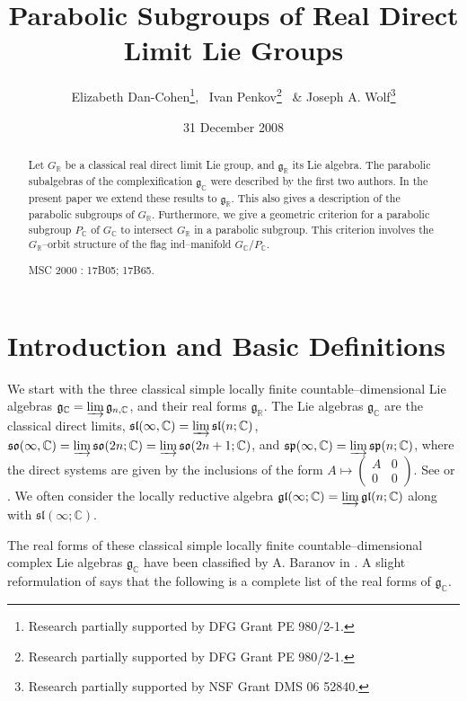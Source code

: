 \documentclass[oneside,leqno,11pt]{article}
\title{Parabolic Subgroups of Real Direct Limit Lie Groups}
\def\gg{\mathfrak{g}}
\def\ggl{\mathfrak{gl}}
\def\gsl{\mathfrak{sl}}
\def\gso{\mathfrak{so}}
\def\gsp{\mathfrak{sp}}
\def\C{\mathbb{C}}
\def\R{\mathbb{R}}
\begin{document}
\author{Elizabeth Dan-Cohen\thanks{Research partially supported by DFG Grant PE 980/2-1.},
\, Ivan Penkov\thanks{Research partially supported by  DFG Grant  PE 980/2-1.}
\, \& Joseph A. Wolf\thanks{Research partially supported by NSF Grant
DMS 06 52840.
}}
\date{31 December 2008}

\maketitle

\begin{abstract}
Let $G_\R$ be a classical real direct limit Lie group, and $\gg_\R$ its 
Lie algebra.  The parabolic subalgebras of the complexification 
$\gg_\C$ were described by the first two authors.  In the present paper 
we extend these results to $\gg_\R$.  This also gives a description of 
the parabolic subgroups of $G_\R$.  Furthermore, we give 
a geometric criterion for a parabolic subgroup $P_\C$ of $G_\C$ to 
intersect $G_\R$ in a parabolic subgroup.  This criterion involves the
$G_\R$--orbit structure of the flag ind--manifold $G_\C/P_\C$.

\vspace{10pt}
\noindent MSC 2000 : 17B05; 17B65.
\end{abstract}

\section{Introduction and Basic Definitions} \label{sec1}
\setcounter{equation}{0}

We start with the three classical simple locally finite countable--dimensional Lie 
algebras $\gg_\C = \varinjlim \gg_{n,\C}$, and their real forms
$\gg_\R$.  The Lie algebras $\gg_\C$ are the classical direct limits,
$\gsl(\infty,\C) = \varinjlim \gsl(n;\C)$,
$\gso(\infty,\C) = \varinjlim \gso(2n;\C) = \varinjlim \gso(2n+1;\C)$, and
$\gsp(\infty,\C) = \varinjlim \gsp(n;\C)$,
where the direct systems are
given by the inclusions of the form
$A \mapsto (\begin{smallmatrix} A & 0 \\ 0 & 0 \end{smallmatrix} )$.
See \cite{B} or \cite{BS}.
We often consider the locally reductive algebra 
$\ggl(\infty;\C) = \varinjlim \ggl(n;\C)$ along with $\gsl(\infty;\C)$.


The real forms of these classical simple locally finite countable--dimensional
complex Lie algebras $\gg_\C$ have been classified by A. Baranov in \cite{B}. 
A slight reformulation of \cite[Theorem 1.4]{B} 
says that the following is a complete list of the real forms of $\gg_\C$.
\end{document}
